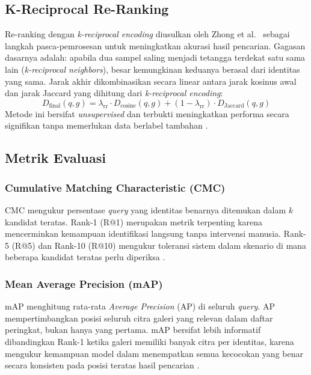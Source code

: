 \subsection{K-Reciprocal Re-Ranking}
Re-ranking dengan \textit{k-reciprocal encoding} diusulkan oleh Zhong et al.\ \cite{zhong2017reranking} sebagai langkah pasca-pemrosesan untuk meningkatkan akurasi hasil pencarian. Gagasan dasarnya adalah: apabila dua sampel saling menjadi tetangga terdekat satu sama lain (\textit{k-reciprocal neighbors}), besar kemungkinan keduanya berasal dari identitas yang sama. Jarak akhir dikombinasikan secara linear antara jarak kosinus awal dan jarak Jaccard yang dihitung dari \textit{k-reciprocal encoding}:
\begin{equation}
    D_{\text{final}}(q, g)
    = \lambda_{\text{rr}} \cdot D_{\text{cosine}}(q, g)
    + (1 - \lambda_{\text{rr}}) \cdot D_{\text{Jaccard}}(q, g)
\end{equation}
Metode ini bersifat \textit{unsupervised} dan terbukti meningkatkan performa secara signifikan tanpa memerlukan data berlabel tambahan \cite{zhong2017reranking}.

\subsection{Metrik Evaluasi}
\subsubsection{Cumulative Matching Characteristic (CMC)}
 
CMC mengukur persentase \textit{query} yang identitas benarnya ditemukan dalam $k$ kandidat teratas. Rank-1 (R@1) merupakan metrik terpenting karena mencerminkan kemampuan identifikasi langsung tanpa intervensi manusia. Rank-5 (R@5) dan Rank-10 (R@10) mengukur toleransi sistem dalam skenario di mana beberapa kandidat teratas perlu diperiksa \cite{zheng2015scalable}.
 
\subsubsection{Mean Average Precision (mAP)}
 
mAP menghitung rata-rata \textit{Average Precision} (AP) di seluruh \textit{query}. AP mempertimbangkan posisi seluruh citra galeri yang relevan dalam daftar peringkat, bukan hanya yang pertama. mAP bersifat lebih informatif dibandingkan Rank-1 ketika galeri memiliki banyak citra per identitas, karena mengukur kemampuan model dalam menempatkan semua kecocokan yang benar secara konsisten pada posisi teratas hasil pencarian \cite{zheng2015scalable}.